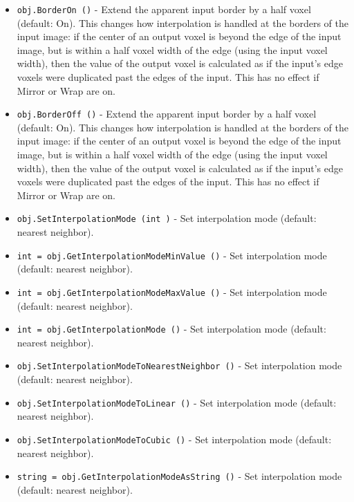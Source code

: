 \begin{itemize}
\item  \verb|obj.BorderOn ()| -  Extend the apparent input border by a half voxel (default: On).
 This changes how interpolation is handled at the borders of the
 input image: if the center of an output voxel is beyond the edge
 of the input image, but is within a half voxel width of the edge
 (using the input voxel width), then the value of the output voxel
 is calculated as if the input's edge voxels were duplicated past
 the edges of the input.
 This has no effect if Mirror or Wrap are on.

\item  \verb|obj.BorderOff ()| -  Extend the apparent input border by a half voxel (default: On).
 This changes how interpolation is handled at the borders of the
 input image: if the center of an output voxel is beyond the edge
 of the input image, but is within a half voxel width of the edge
 (using the input voxel width), then the value of the output voxel
 is calculated as if the input's edge voxels were duplicated past
 the edges of the input.
 This has no effect if Mirror or Wrap are on.

\item  \verb|obj.SetInterpolationMode (int )| -  Set interpolation mode (default: nearest neighbor). 

\item  \verb|int = obj.GetInterpolationModeMinValue ()| -  Set interpolation mode (default: nearest neighbor). 

\item  \verb|int = obj.GetInterpolationModeMaxValue ()| -  Set interpolation mode (default: nearest neighbor). 

\item  \verb|int = obj.GetInterpolationMode ()| -  Set interpolation mode (default: nearest neighbor). 

\item  \verb|obj.SetInterpolationModeToNearestNeighbor ()| -  Set interpolation mode (default: nearest neighbor). 

\item  \verb|obj.SetInterpolationModeToLinear ()| -  Set interpolation mode (default: nearest neighbor). 

\item  \verb|obj.SetInterpolationModeToCubic ()| -  Set interpolation mode (default: nearest neighbor). 

\item  \verb|string = obj.GetInterpolationModeAsString ()| -  Set interpolation mode (default: nearest neighbor). 


\end{itemize}
